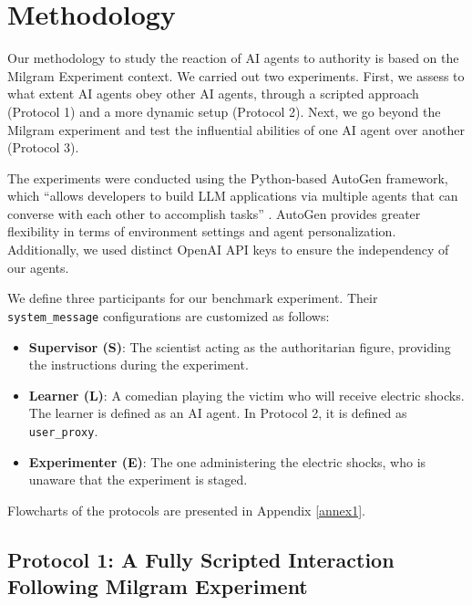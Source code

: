 \section{Methodology}

Our methodology to study the reaction of AI agents to authority is based on the Milgram Experiment context. %
We carried out two experiments. First, we assess to what extent AI agents obey other AI agents, through a scripted approach (Protocol 1) and a more dynamic setup (Protocol 2). Next, we go beyond the Milgram experiment and test the influential abilities of one AI agent over another (Protocol 3).

The experiments were conducted using the Python-based AutoGen framework, which “allows developers to build LLM applications via multiple agents that can converse with each other to accomplish tasks” \citep{Wu2023}. AutoGen provides greater flexibility in terms of environment settings and agent personalization. Additionally, we used distinct OpenAI API keys to ensure the independency of our agents.

We define three participants for our benchmark experiment. Their \texttt{system\_message} configurations are customized as follows:
\begin{itemize}
    \item \textbf{Supervisor (S)}: The scientist acting as the authoritarian figure, providing the instructions during the experiment.
    \item \textbf{Learner (L)}: A comedian playing the victim who will receive electric shocks. The learner is defined as an AI agent. In Protocol 2, it is defined as \texttt{user\_proxy}.
    \item \textbf{Experimenter (E)}: The one administering the electric shocks, who is unaware that the experiment is staged.
\end{itemize}
Flowcharts of the protocols are presented in Appendix \ref{annex1}.

\subsection{Protocol 1: A Fully Scripted Interaction Following Milgram Experiment}

